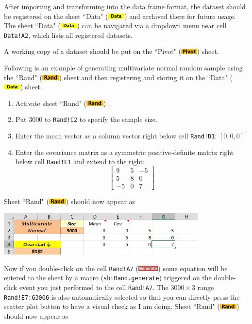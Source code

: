 \documentclass[article]{jss}
\newcommand{\shtData}{``Data" (\includegraphics[height=8pt, keepaspectratio=true]{DataSheetTab_png}) }
\newcommand{\shtRand}{``Rand" (\includegraphics[height=8pt, keepaspectratio=true]{RandSheetTab_png}) }
\newcommand{\shtPivot}{``Pivot" (\includegraphics[height=8pt, keepaspectratio=true]{PivotSheetTab_png}) }
\begin{document}
        After importing and transforming into the data frame format, the dataset should be registered on the sheet \shtData and archived there for future usage. The sheet \shtData can be navigated via a dropdown menu near cell \texttt{Data!A2}, which lists all registered datasets. 
        
        A working copy of a dataset should be put on the \shtPivot sheet.
        
        Following is an example of generating multivariate normal random sample using the \shtRand sheet and then registering and storing it on the \shtData sheet. \\
        \begin{enumerate}
        \item Activate sheet \shtRand.
        \item Put 3000 to \texttt{Rand!C2} to specify the sample size.
        \item Enter the mean vector as a column vector right below cell \texttt{Rand!D1}: $[0,0,0]^\intercal$
        \item Enter the covariance matrix as a symmetric positive-definite matrix right below cell \texttt{Rand!E1} and extend to the right:  
        \[\left[ {\begin{array}{*{20}{c}}
        9&5&-5 \\ 
        5&8&0 \\ 
        -5&0&7 
        \end{array}} \right]\]
        \end{enumerate}
        Sheet \shtRand should now appear as
        \begin{center}
	        \includegraphics[height=64pt, keepaspectratio=true]{RandSheetAfterInput_png}
        \end{center}
        Now if you double-click on the cell \texttt{Rand!A7} (\includegraphics[height=8pt, keepaspectratio=true]{RandSheet_GenerateButton_png}) some equation will be entered to the sheet by a  macro (\texttt{shtRand.generate}) triggered on the double-click event you just performed to the cell \texttt{Rand!A7}. The $3000\times 3$ range \texttt{Rand!E7:G3006} is also automatically selected so that you can directly press the scatter plot button to have a visual check as I am doing. Sheet \shtRand should now appear as
\end{document}

